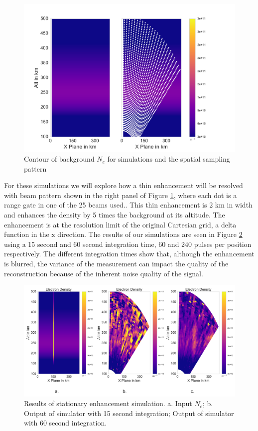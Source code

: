 \documentclass[draft,ras]{agutex}
\begin{document}
\begin{article}
\begin{figure}[!t]
\centering
\includegraphics[width=5in]{backgroundandsamp}
\caption{Contour of background $N_e$ for simulations and the spatial sampling pattern}
\label{fig:background1}
\end{figure}

For these simulations we will explore how a thin enhancement will be resolved with beam pattern shown in the right panel of Figure \ref{fig:background1}, where each dot is a range gate in one of the 25 beams used.. This thin enhancement is 2 km in width and enhances the density by 5 times the background at its altitude. The enhancement is at the resolution limit of the original Cartesian grid, a delta function in the x direction. The results of our simulations are seen in Figure \ref{fig:stationaryall} using a 15 second and 60 second integration time, 60 and 240 pulses per position respectively. The different integration times show that, although the enhancement is blurred, the variance of the measurement can impact the quality of the reconstruction because of the inherent noise quality of the signal.

\begin{figure}[!t]
\centering
\includegraphics[width=5in]{stationary}
\caption{Results of stationary enhancement simulation. a. Input $N_e$; b. Output of simulator with 15 second integration;  Output of simulator with 60 second integration.}
\label{fig:stationaryall}
\end{figure}


\end{article}
\end{document}
